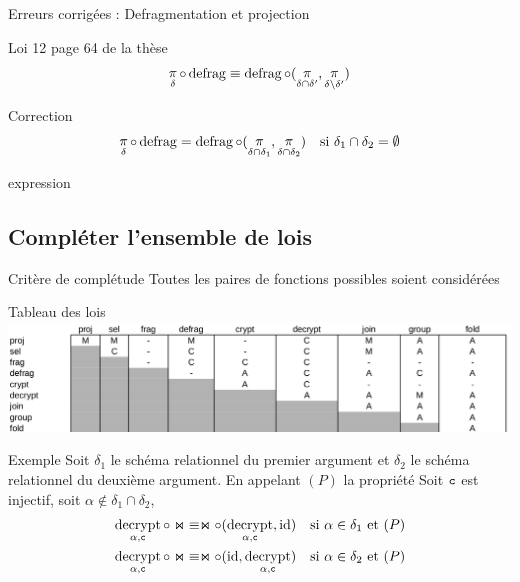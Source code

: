 \documentclass{beamer}
\DeclareMathOperator{\proj}{\mathchar"1119}
\DeclareMathOperator{\defrag}{defrag}
\DeclareMathOperator{\decrypt}{decrypt}
\DeclareMathOperator{\id}{id}
\newcommand\typeT[1]{\text{\ttfamily #1}}
\newcommand{\decryptArgs}[2]{\decrypt_{#1 , \typeT{#2}}}
\newcommand{\projDelta}{\proj_{\delta}}
\newcommand{\decryptCAlpha}{\decryptArgs{\alpha}{c}}
\newcommand{\ch}{\typeT{c}}
\begin{document}
\begin{frame}{Erreurs corrigées : Defragmentation et projection}
\begin{block}{Loi 12 page 64 de la thèse}
$$
\projDelta \circ \defrag
\equiv \defrag \circ (\proj_{\delta \cap \delta'} , \proj_{\delta \setminus \delta'})
$$
\end{block}
\begin{exampleblock}{Correction}
\begin{align*}
\projDelta \circ \defrag
& = \defrag \circ (\proj_{\delta \cap \delta_1}, \proj_{\delta \cap \delta_2})
& \text{si $\delta_1 \cap \delta_2 = \emptyset$}
\end{align*}
\end{exampleblock}
\end{frame}expression

\subsection{Compléter l'ensemble de lois}
\begin{frame}{Critère de complétude}
Toutes les paires de fonctions possibles soient considérées
\end{frame}

\begin{frame}{Tableau des lois}
\includegraphics[width=\textwidth]{complLoisBilan.png}
\end{frame}

\begin{frame}{Exemple}
Soit $\delta_1$ le schéma relationnel du premier
	argument et $\delta_2$ le schéma relationnel du deuxième
	argument.
En appelant $(P)$ la propriété
\og Soit $\ch$ est injectif, soit $\alpha \notin \delta_1 \cap \delta_2$\fg{},
\begin{align}
\decryptCAlpha \circ \Join
& \equiv
\Join \circ (\decryptCAlpha, \id)
& \text{si $\alpha \in \delta_1$ et $(P)$} \\
\decryptCAlpha \circ \Join
& \equiv
\Join \circ (\id, \decryptCAlpha)
& \text{si $\alpha \in \delta_2$ et $(P)$} 
\end{align}
\end{frame}
\end{document}
